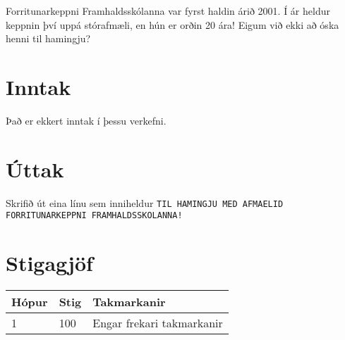 Forritunarkeppni Framhaldsskólanna var fyrst haldin árið 2001. Í ár heldur
keppnin því uppá stórafmæli, en hún er orðin 20 ára! Eigum við ekki að óska
henni til hamingju?

\section*{Inntak}
Það er ekkert inntak í þessu verkefni.

\section*{Úttak}
Skrifið út eina línu sem inniheldur \texttt{TIL HAMINGJU MED AFMAELID FORRITUNARKEPPNI FRAMHALDSSKOLANNA!}

\section*{Stigagjöf}
\begin{tabular}{|l|l|l|}
\hline
Hópur & Stig & Takmarkanir \\ \hline
1     & 100  & Engar frekari takmarkanir\\ \hline
\end{tabular}
